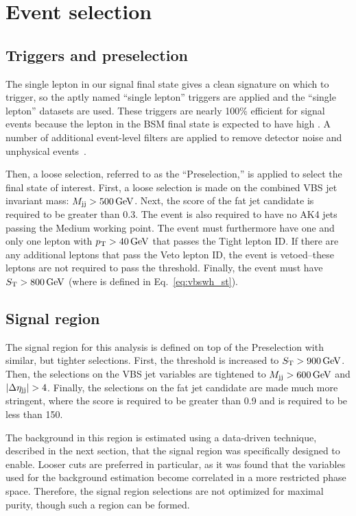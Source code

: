 \section{Event selection}
\subsection{Triggers and preselection}
The single lepton in our signal final state gives a clean signature on which to trigger, so the aptly named ``single lepton'' triggers are applied and the ``single lepton'' datasets are used. 
These triggers are nearly 100\% efficient for signal events because the lepton in the BSM final state is expected to have high \pt. 
A number of additional event-level filters are applied to remove detector noise and unphysical events~\cite{JMEPaper}. 

Then, a loose selection, referred to as the ``Preselection,'' is applied to select the final state of interest. 
First, a loose selection is made on the combined VBS jet invariant mass: $M_{\mathrm{j}\mathrm{j}} > 500\,\text{Ge\hspace{-.08em}V}$.
Next, the \ParticleNet \Xtobb score of the \Htobb fat jet candidate is required to be greater than 0.3.
The event is also required to have no AK4 jets passing the Medium \DeepJet working point.
The event must furthermore have one and only one lepton with $p_{\mathrm{T}} > 40\,\text{Ge\hspace{-.08em}V}$ that passes the Tight lepton ID. 
If there are any additional leptons that pass the Veto lepton ID, the event is vetoed--these leptons are not required to pass the \pt threshold. 
Finally, the event must have $S_{\mathrm{T}} > 800\,\text{Ge\hspace{-.08em}V}$ (where \ST is defined in Eq.~\ref{eq:vbswh_st}).

\subsection{Signal region}
The signal region for this analysis is defined on top of the Preselection with similar, but tighter selections. 
First, the \ST threshold is increased to $S_{\mathrm{T}} > 900\,\text{Ge\hspace{-.08em}V}$. 
Then, the selections on the VBS jet variables are tightened to $M_{\mathrm{j}\mathrm{j}} > 600 \,\text{Ge\hspace{-.08em}V}$ and $|\Delta\eta_{\mathrm{j}\mathrm{j}}| > 4$. 
Finally, the selections on the \Htobb fat jet candidate are made much more stringent, where the \ParticleNet \Xtobb score is required to be greater than 0.9 and \MSD is required to be less than 150\GeV. 

The background in this region is estimated using a data-driven technique, described in the next section, that the signal region was specifically designed to enable. 
Looser cuts are preferred in particular, as it was found that the variables used for the background estimation become correlated in a more restricted phase space. 
Therefore, the signal region selections are not optimized for maximal purity, though such a region can be formed. 

